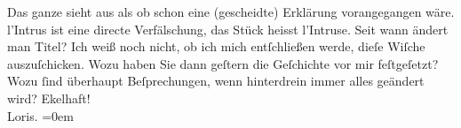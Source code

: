\begin{ledgroupsized}[t]{13cm}
           \pstart
           Das ganze sieht aus als ob schon eine (gescheidte) Erklärung vorangegangen wäre. l’Intrus ist eine directe Verfälschung, das Stück
               heisst l’Intruse. {\pb}Seit wann ändert man Titel?\pend
           \pstart
           Ich weiß noch nicht, ob ich mich entſchließen werde, dieſe Wiſche auszuſchicken. Wozu
               haben Sie dann geſtern die Geſchichte vor mir feſtgeſetzt? Wozu ſind überhaupt
               Beſprechungen, wenn hinterdrein immer alles geändert wird?\pend
           \pstart
           Ekelhaft!{\\[\baselineskip]}\spacefill\mbox{Loris.}\pend
           \leftskip=0em{}
         
         \endnumbering{}\end{ledgroupsized}  \newcommand{\dateiname}{L00092}\newcommand{\titel}{Hugo von Hofmannsthal an Arthur Schnitzler, [4. 4. 1892?]}\newcommand{\editorInnen}{Martin Anton Müller und Gerd-Hermann Susen}
      